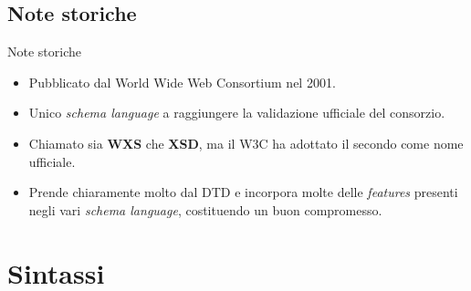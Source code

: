 \documentclass{beamer}
\begin{document}
    \subsection{Note storiche}
    \begin{frame}{Note storiche}
    \begin{itemize}
    \item Pubblicato dal World Wide Web Consortium nel 2001.
    \item Unico \textit{schema language} a raggiungere la validazione ufficiale del consorzio.
    \item Chiamato sia \textbf{WXS} che \textbf{XSD}, ma il W3C ha adottato il secondo come nome ufficiale.
    \item Prende chiaramente molto dal DTD e incorpora molte delle \textit{features} presenti negli vari \textit{schema language}, costituendo un buon compromesso.
    \end{itemize}
    \end{frame}
    
   \section{Sintassi} 
\end{document}

